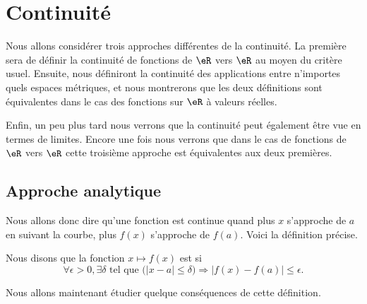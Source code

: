 
\section{Continuité}

Nous allons considérer trois approches différentes de la continuité. La première sera de définir la continuité de fonctions de $\eR$ vers $\eR$ au moyen du critère usuel. Ensuite, nous définiront la continuité des applications entre n'importes quels espaces métriques, et nous montrerons que les deux définitions sont équivalentes dans le cas des fonctions sur $\eR$ à valeurs réelles.

Enfin, un peu plus tard nous verrons que la continuité peut également être vue en termes de limites. Encore une fois nous verrons que dans le cas de fonctions de $\eR$ vers $\eR$ cette troisième approche est équivalentes aux deux premières.

\subsection{Approche analytique}

Nous allons donc dire qu'une fonction est continue quand plus $x$ s'approche de $a$ en suivant la courbe, plus $f(x)$ s'approche de $f(a)$. Voici la définition précise.
\begin{definition}      \label{DefContinue}
Nous disons que la fonction $x\mapsto f(x)$ est  si
\begin{equation}
 \forall \epsilon>0,\exists \delta\text{ tel que } \big(| x-a |\leq\delta\big)\Rightarrow | f(x)-f(a) |\leq \epsilon.
\end{equation}
\end{definition}
Nous allons maintenant étudier quelque conséquences de cette définition. 

